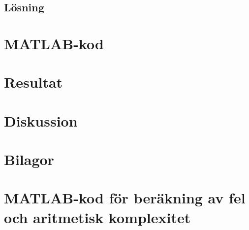 \documentclass[a4paper,titlepage]{article}
\begin{document}
\subsection{Lösning}


\section{MATLAB-kod}



\section{Resultat}


\section{Diskussion}



\section*{Bilagor}
\appendix

\section{MATLAB-kod för beräkning av fel och aritmetisk komplexitet}
\label{sec:testcode}
\end{document}
